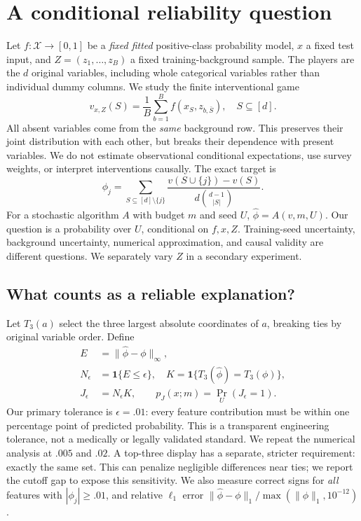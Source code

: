 \section{A conditional reliability question}
\label{sec:method}
Let $f:\mathcal X\to[0,1]$ be a \emph{fixed fitted} positive-class probability model, $x$ a fixed test input, and $Z=(z_1,\ldots,z_B)$ a fixed training-background sample. The players are the $d$ original variables, including whole categorical variables rather than individual dummy columns. We study the finite interventional game
\begin{equation}
 v_{x,Z}(S)=\frac1B\sum_{b=1}^B f(x_S,z_{b,\bar S}),\quad S\subseteq[d].
 \label{eq:game}
\end{equation}
All absent variables come from the \emph{same} background row. This preserves their joint distribution with each other, but breaks their dependence with present variables. We do not estimate observational conditional expectations, use survey weights, or interpret interventions causally. The exact target is
\begin{equation}
 \phi_j=\sum_{S\subseteq[d]\setminus\{j\}}
 \frac{v(S\cup\{j\})-v(S)}{d\binom{d-1}{|S|}}.
 \label{eq:shap}
\end{equation}
For a stochastic algorithm $A$ with budget $m$ and seed $U$, $\widehat\phi=A(v,m,U)$. Our question is a probability over $U$, conditional on $f,x,Z$. Training-seed uncertainty, background uncertainty, numerical approximation, and causal validity are different questions. We separately vary $Z$ in a secondary experiment.

\subsection{What counts as a reliable explanation?}
\label{sec:metrics}
Let $T_3(a)$ select the three largest absolute coordinates of $a$, breaking ties by original variable order. Define
\begin{align}
 E&=\|\widehat\phi-\phi\|_\infty,\\
 N_\epsilon&=\mathbf1\{E\leq\epsilon\},\quad
 K=\mathbf1\{T_3(\widehat\phi)=T_3(\phi)\},\\
 J_\epsilon&=N_\epsilon K,\qquad
 p_J(x;m)=\Pr_U(J_\epsilon=1).
\end{align}
Our primary tolerance is $\epsilon=.01$: every feature contribution must be within one percentage point of predicted probability. This is a transparent engineering tolerance, not a medically or legally validated standard. We repeat the numerical analysis at $.005$ and $.02$. A top-three display has a separate, stricter requirement: exactly the same set. This can penalize negligible differences near ties; we report the cutoff gap to expose this sensitivity. We also measure correct signs for \emph{all} features with $|\phi_j|\geq .01$, and relative $\ell_1$ error $\|\widehat\phi-\phi\|_1/\max(\|\phi\|_1,10^{-12})$.

